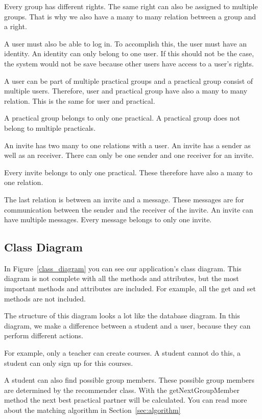 Every group has different rights.
The same right can also be assigned to multiple groups.
That is why we also have a many to many relation between a group and a right.

A user must also be able to log in.
To accomplish this, the user must have an identity.
An identity can only belong to one user.
If this should not be the case, the system would not be save because other users have access to a user's rights.

A user can be part of multiple practical groups and a practical group consist of multiple users.
Therefore, user and practical group have also a many to many relation.
This is the same for user and practical.

A practical group belongs to only one practical.
A practical group does not belong to multiple practicals.

An invite has two many to one relations with a user.
An invite has a sender as well as an receiver.
There can only be one sender and one receiver for an invite.

Every invite belongs to only one practical.
These therefore have also a many to one relation.

The last relation is between an invite and a message.
These messages are for communication between the sender and the receiver of the invite.
An invite can have multiple messages.
Every message belongs to only one invite.

\subsection{Class Diagram}
In Figure~\ref{class_diagram} you can see our application's class diagram.
This diagram is not complete with all the methods and attributes, but the most important methods and attributes are included.
For example, all the get and set methods are not included.

The structure of this diagram looks a lot like the database diagram.
In this diagram, we make a difference between a student and a user, because they can perform different actions.

For example, only a teacher can create courses.
A student cannot do this, a student can only sign up for this courses.

A student can also find possible group members.
These possible group members are determined by the recommender class.
With the getNextGroupMember method the next best practical partner will be calculated.
You can read more about the matching algorithm in Section~\ref{sec:algorithm}

